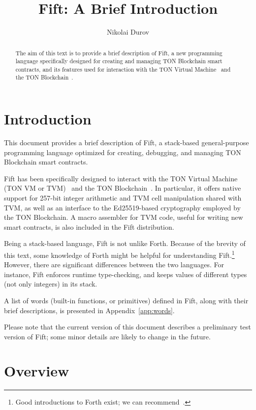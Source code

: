 \documentclass[12pt,oneside]{article}
\title{Fift: A Brief Introduction}
\author{Nikolai Durov}
\def\markbothsame#1{\fancyhead[C]{#1}}
\def\mysection#1{\section{#1}\fancyhead[C]{\textsc{Chapter \textbf{\thesection.} #1}}}
\begin{document}
\maketitle

\begin{abstract}
  The aim of this text is to provide a brief description of Fift, a new programming language specifically designed for creating and managing TON Blockchain smart contracts, and its features used for interaction with the TON Virtual Machine~\cite{TVM} and the TON Blockchain~\cite{TBC}.
\end{abstract}

\section*{Introduction}
\markbothsame{Introduction}

This document provides a brief description of Fift, a stack-based general-purpose programming language optimized for creating, debugging, and managing TON Blockchain smart contracts.

Fift has been specifically designed to interact with the TON Virtual Machine (TON VM or TVM)~\cite{TVM} and the TON Blockchain~\cite{TBC}. In particular, it offers native support for 257-bit integer arithmetic and TVM cell manipulation shared with TVM, as well as an interface to the Ed25519-based cryptography employed by the TON Blockchain. A macro assembler for TVM code, useful for writing new smart contracts, is also included in the Fift distribution.

Being a stack-based language, Fift is not unlike Forth. Because of the brevity of this text, some knowledge of Forth might be helpful for understanding Fift.\footnote{Good introductions to Forth exist; we can recommend~\cite{Brodie}.} However, there are significant differences between the two languages. For instance, Fift enforces runtime type-checking, and keeps values of different types (not only integers) in its stack.

A list of words (built-in functions, or primitives) defined in Fift, along with their brief descriptions, is presented in Appendix~\ref{app:words}.

Please note that the current version of this document describes a preliminary test version of Fift; some minor details are likely to change in the future.

\clearpage
\tableofcontents

\clearpage
\mysection{Overview}\label{sect:overview}
\end{document}
